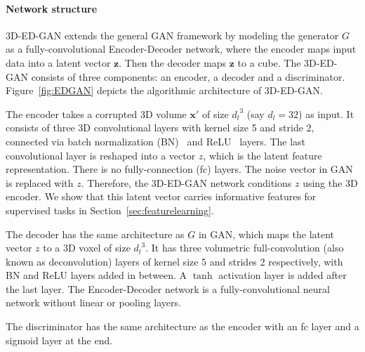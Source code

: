 \documentclass[10pt,twocolumn,letterpaper]{article}
\begin{document}
\paragraph*{Network structure} 3D-ED-GAN extends the general GAN framework by modeling the generator $G$ as a fully-convolutional Encoder-Decoder network, where the encoder maps input data into a latent vector $\mathbf{z}$. Then the decoder maps $\mathbf{z}$ to a cube. The 3D-ED-GAN consists of three components: an encoder, a decoder and a discriminator. Figure~\ref{fig:EDGAN} depicts the algorithmic architecture of 3D-ED-GAN.


The encoder takes a corrupted 3D volume $\mathbf{x}'$ of size ${d_l}^3$ (say $d_l = 32$) as input. It consists of three 3D convolutional layers with kernel size 5 and stride 2, connected via batch normalization (BN)~\cite{bn} and ReLU~\cite{prelu} layers. The last convolutional layer is reshaped into a vector $z$, which is the latent feature representation. There is no fully-connection (fc) layers. The noise vector in GAN is replaced with $z$. Therefore, the 3D-ED-GAN network conditions $z$ using the 3D encoder. We show that this latent vector carries informative features for supervised tasks in Section~\ref{sec:featurelearning}.

The decoder has the same architecture as $G$ in GAN, which maps the latent vector $z$ to a 3D voxel of size ${d_l}^3$. It has three volumetric full-convolution (also known as deconvolution) layers of kernel size 5 and strides 2 respectively, with BN and ReLU layers added in between. A $\tanh$ activation layer is added after the last layer. The Encoder-Decoder network is a fully-convolutional neural network without linear or pooling layers.

The discriminator has the same architecture as the encoder with an fc layer and a sigmoid layer at the end. 
\end{document}

